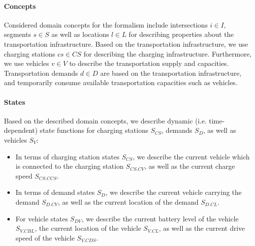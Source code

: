 \documentclass[a4paper,twoside]{article}
\begin{document}
	\paragraph{Concepts}
	
	Considered domain concepts for the formalism include intersections $i \in I$, segments $s \in S$ as well as locations $l \in L$ for describing properties about the transportation infrastructure.
	Based on the transportation infrastructure, we use charging stations $cs \in CS$ for describing the charging infrastructure. Furthermore, we use vehicles $v \in V$ to describe the transportation supply and capacities. Transportation demands $d \in D$ are based on the transportation infrastructure, and temporarily consume available transportation capacities such as vehicles.
	
	\paragraph{States}
	Based on the described domain concepts, we describe dynamic (i.e. time-dependent) state functions for charging stations $S_{CS}$, demands $S_{D}$, as well as vehicles $S_V$:
	
	\begin{itemize}
		\item In terms of charging station states $S_{CS}$, we describe the current vehicle which is connected to the charging station $S_{CS.CV}$, as well as the current charge speed $S_{CS.CCS}$.
		\item In terms of demand states $S_{D}$, we describe the current vehicle carrying the demand $S_{D.CV}$, as well as the current location of the demand $S_{D.CL}$.
		\item For vehicle states $S_{DV}$, we describe the current battery level of the vehicle $S_{V.CBL}$, the current location of the vehicle $S_{V.CL}$, as well as the current drive speed of the vehicle $S_{V.CDS}$.
	\end{itemize}
	
\end{document}
